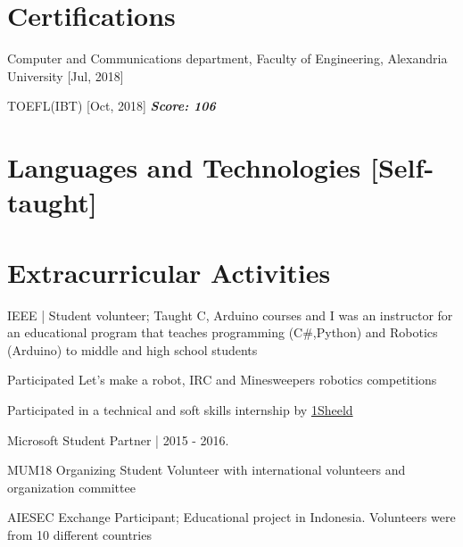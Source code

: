 \documentclass[paper=a4,fontsize=11pt]{scrartcl} %
\newcommand{\BoldIt}[1]{\textbf{\textit{#1}}}
\begin{document}
\section{Certifications}
\begin{itemize*}
	\item Computer and Communications department, Faculty of Engineering, Alexandria University [Jul, 2018] %
	\item TOEFL(IBT) [Oct, 2018] \BoldIt{Score: 106}
\end{itemize*}
\section{Languages and Technologies [Self-taught]}
\hspace{\parindent}{C++, Python, Raspberry Pi, MCS-51, Arduino, Kotlin, Rust, Android, Git, \LaTeX, Linux, Machine Learning, OpenGL. Sample Readings: Linux System programming (Robert Love), Exploring  RPi (David Molloy)
}
\section{Extracurricular Activities}

\begin{itemize*}
	\item IEEE | Student volunteer; Taught C, Arduino courses and I was an instructor for an educational program that teaches programming (C\#,Python) and Robotics (Arduino) to middle and high school students
	\item Participated Let's make a robot, IRC and Minesweepers robotics competitions
	\item Participated in a technical and soft skills internship by \href{https://1sheeld.com/}{1Sheeld}
	\item Microsoft Student Partner | 2015 - 2016.
	\item MUM18 Organizing Student Volunteer with international volunteers and organization committee
	\item AIESEC Exchange Participant; Educational project in Indonesia. Volunteers were from 10 different countries
\end{itemize*}
\end{document}
